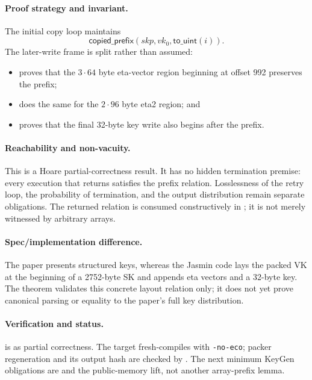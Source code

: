 \paragraph{Proof strategy and invariant.}
The initial copy loop maintains
\[
  \mathsf{copied\_prefix}(skp,vk_0,\mathsf{to\_uint}(i)).
\]
The later-write frame is split rather than assumed:
\begin{itemize}
  \item {} proves that the
  \(3\cdot64\) byte eta-vector region beginning at offset 992 preserves the
  prefix;
  \item {} does the same for the
  \(2\cdot96\) byte eta2 region; and
  \item {} proves that the final
  32-byte key write also begins after the prefix.
\end{itemize}

\paragraph{Reachability and non-vacuity.}
This is a Hoare partial-correctness result. It has no hidden termination
premise: every execution that returns satisfies the prefix relation.
Losslessness of the retry loop, the probability of termination, and the output
distribution remain separate obligations. The returned relation is consumed
constructively in
;
it is not merely witnessed by arbitrary arrays.

\paragraph{Spec/implementation difference.}
The paper presents structured keys, whereas the Jasmin code lays the packed VK
at the beginning of a 2752-byte SK and appends eta vectors and a 32-byte key.
The theorem validates this concrete layout relation only; it does not yet prove
canonical parsing or equality to the paper's full key distribution.

\paragraph{Verification and status.}
 is  as partial correctness. The target
fresh-compiles with \texttt{-no-eco}; packer regeneration and its output hash
are checked by . The next minimum KeyGen
obligations are  and the public-memory lift, not
another array-prefix lemma.

